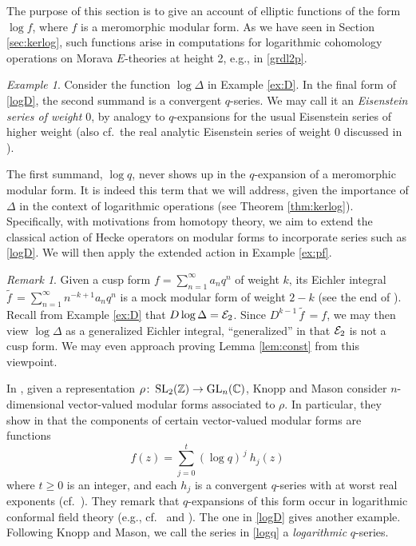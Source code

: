 \documentclass{gtpart}
\theoremstyle{definition}
\theoremstyle{remark}
\newtheorem{rmk}[equation]{Remark}
\newtheorem{ex}[equation]{Example}
\def\co{\colon\thinspace}
\newcommand{\mb}[1]{\mathbb{#1}}
\newcommand{\CE}{{\cal E}}
\newcommand{\BC}{{\mb C}}
\newcommand{\BZ}{{\mb Z}}
\renewcommand{\D}{\Delta}
\renewcommand{\=}{\approx}
\renewcommand{\-}{\sim}
\newcommand{\GL}{{\rm GL}}
\newcommand{\SL}{{\rm SL}}
\numberwithin{equation}{section}
\begin{document}
The purpose of this section is to give an account of elliptic functions of the 
form $\log f$, where $f$ is a meromorphic modular form.  As we have seen in 
Section \ref{sec:kerlog}, such functions arise in computations for logarithmic 
cohomology operations on Morava $E$-theories at height 2, e.g., in 
\eqref{grdl2p}.  

\begin{ex}
 \label{ex:logD}
 Consider the function $\log \D$ in Example \ref{ex:D}.  In the final form of 
 \eqref{logD}, the second summand is a convergent $q$-series.  We may call it an 
 {\em Eisenstein series of weight $0$}, by analogy to $q$-expansions for the 
 usual Eisenstein series of higher weight (also cf.~the real analytic Eisenstein 
 series of weight 0 discussed in \cite[Sections 3.3 and 4.1]{Funke}).  

 The first summand, $\log q$, never shows up in the $q$-expansion of a 
 meromorphic modular form.  It is indeed this term that we will address, given 
 the importance of $\D$ in the context of logarithmic operations (see Theorem 
 \ref{thm:kerlog}).  Specifically, with motivations from homotopy theory, we aim 
 to extend the classical action of Hecke operators on modular forms to 
 incorporate series such as \eqref{logD}.  We will then apply the extended 
 action in Example \ref{ex:pf}.  
\end{ex}

\begin{rmk}
 \label{rmk:eichler}
 Given a cusp form $f = \sum_{n = 1}^\infty a_n q^n$ of weight $k$, its Eichler 
 integral $\widetilde{f\,} = \sum_{n = 1}^\infty n^{-k + 1} a_n q^n$ is a mock 
 modular form of weight $2 - k$ (see the end of \cite[\S 6]{mock}).  Recall from 
 Example \ref{ex:D} that $D \log \D = \CE_2$.  Since 
 $D^{k - 1} \, \widetilde{f\,} = f$, we may then view $\log \D$ as a generalized 
 Eichler integral, ``generalized'' in that $\CE_2$ is not a cusp form.  We may 
 even approach proving Lemma \ref{lem:const} from this viewpoint.  
\end{rmk}

In \cite{KnoppMason}, given a representation 
$\rho \co \SL_2(\BZ) \to \GL_n(\BC)$, Knopp and Mason consider $n$-dimensional 
vector-valued modular forms associated to $\rho$.  In particular, they show in 
\cite[Theorem 2.2]{KnoppMason} that the components of certain vector-valued 
modular forms are functions 
\begin{equation}
 \label{logq}
 f(z) = \sum_{j = 0}^t (\log q)^{\,j} ~\! h_j(z) 
\end{equation}
where $t \geq 0$ is an integer, and each $h_j$ is a convergent $q$-series with 
at worst real exponents 
(cf.~\cite[(7), (13), and Sections 3.2--3.3]{KnoppMason}).  They remark that 
$q$-expansions of this form occur in logarithmic conformal field theory (e.g., 
cf.~\cite[(5.3.9)]{Zhu} and \cite[(6.12)]{DongLiMason}).  The one in 
\eqref{logD} gives another example.  Following Knopp and Mason, we call the 
series in \eqref{logq} a {\em logarithmic} $q$-series.  
\end{document}
